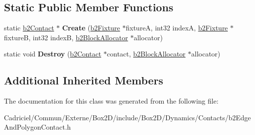 \subsection*{Static Public Member Functions}
\begin{DoxyCompactItemize}
\item 
static \hyperlink{classb2_contact}{b2\+Contact} $\ast$ {\bfseries Create} (\hyperlink{classb2_fixture}{b2\+Fixture} $\ast$fixtureA, int32 indexA, \hyperlink{classb2_fixture}{b2\+Fixture} $\ast$fixtureB, int32 indexB, \hyperlink{classb2_block_allocator}{b2\+Block\+Allocator} $\ast$allocator)\hypertarget{classb2_edge_and_polygon_contact_a43c450ab34c63cb7dca91ed04a6bacaf}{}\label{classb2_edge_and_polygon_contact_a43c450ab34c63cb7dca91ed04a6bacaf}

\item 
static void {\bfseries Destroy} (\hyperlink{classb2_contact}{b2\+Contact} $\ast$contact, \hyperlink{classb2_block_allocator}{b2\+Block\+Allocator} $\ast$allocator)\hypertarget{classb2_edge_and_polygon_contact_aefebb57eb58fa87a609033b0d4991a66}{}\label{classb2_edge_and_polygon_contact_aefebb57eb58fa87a609033b0d4991a66}

\end{DoxyCompactItemize}
\subsection*{Additional Inherited Members}


The documentation for this class was generated from the following file\+:\begin{DoxyCompactItemize}
\item 
Cadriciel/\+Commun/\+Externe/\+Box2\+D/include/\+Box2\+D/\+Dynamics/\+Contacts/b2\+Edge\+And\+Polygon\+Contact.\+h\end{DoxyCompactItemize}
